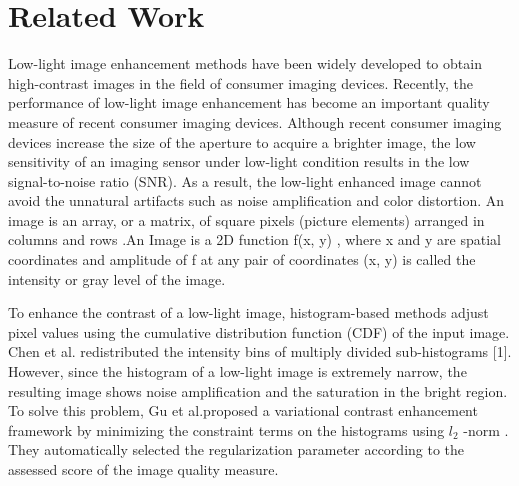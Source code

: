 \chapter{Related Work}
Low-light image enhancement methods have been widely developed to obtain high-contrast images in the field of consumer imaging devices. Recently, the performance of low-light image enhancement has become an important quality measure of recent consumer imaging devices. Although recent consumer imaging devices increase the size of the aperture to acquire a brighter image, the low sensitivity of an imaging
sensor under low-light condition results in the low signal-to-noise ratio (SNR). As a result, the low-light enhanced image cannot avoid the unnatural artifacts such as noise amplification and color distortion. An image is an array, or a matrix, of square pixels (picture elements) arranged in columns and rows .An Image is a 2D function f(x, y) , where x and y are spatial coordinates and amplitude of f at any pair of coordinates (x, y) is called the intensity or gray level of the image.

To enhance the contrast of a low-light image, histogram-based methods adjust pixel values using the cumulative distribution function (CDF) of the input image. Chen et al. redistributed the intensity bins of multiply divided sub-histograms [1]. However, since the histogram of a low-light image is extremely narrow, the resulting image shows noise amplification and the saturation in the bright region. To solve this problem, Gu et al.proposed a variational contrast enhancement framework by minimizing the constraint terms on the histograms using $l_{2}$ -norm . They automatically selected the regularization parameter according to the assessed score of the image quality
measure.

